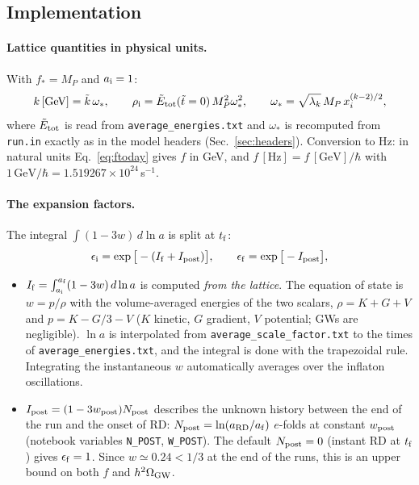 \documentclass[11pt,a4paper]{article}
\newcommand{\MP}{M_P}
\newcommand{\file}[1]{\texttt{#1}}
\begin{document}
\subsection{Implementation}
\label{sec:redshift-impl}
\paragraph{Lattice quantities in physical units.} With $f_*=\MP$ and $a_{\rm i}=1$:
\begin{equation}
k\,[\text{GeV}]=\tilde k\,\omega_*,\qquad
\rho_{\rm i}=\tilde E_{\rm tot}(\tilde t=0)\,\MP^2\omega_*^2,\qquad
\omega_*=\sqrt{\lambda_k}\,\MP\,x_i^{(k-2)/2},
\end{equation}
where $\tilde E_{\rm tot}$ is read from \file{average\_energies.txt} and $\omega_*$ is recomputed from \file{run.in} exactly as in the model headers (Sec.~\ref{sec:headers}). Conversion to Hz: in natural units Eq.~\eqref{eq:ftoday} gives $f$ in GeV, and $f\,[\text{Hz}]=f\,[\text{GeV}]/\hbar$ with $1\,\text{GeV}/\hbar=1.519267\times10^{24}$\,s$^{-1}$.

\paragraph{The expansion factors.} The integral $\int(1-3w)\,d\ln a$ is split at $t_{\rm f}$:
\begin{equation}
\epsilon_{\rm i}=\exp\big[-(I_{\rm f}+I_{\rm post})\big],\qquad \epsilon_{\rm f}=\exp\big[-I_{\rm post}\big],
\end{equation}
\begin{itemize}
\item $I_{\rm f}=\int_{a_{\rm i}}^{a_{\rm f}}(1-3w)\,d\ln a$ is computed \emph{from the lattice}. The equation of state is $w=p/\rho$ with the volume-averaged energies of the two scalars, $\rho=K+G+V$ and $p=K-G/3-V$ ($K$ kinetic, $G$ gradient, $V$ potential; GWs are negligible). $\ln a$ is interpolated from \file{average\_scale\_factor.txt} to the times of \file{average\_energies.txt}, and the integral is done with the trapezoidal rule. Integrating the instantaneous $w$ automatically averages over the inflaton oscillations.
\item $I_{\rm post}=(1-3w_{\rm post})N_{\rm post}$ describes the unknown history between the end of the run and the onset of RD: $N_{\rm post}=\ln(a_{\rm RD}/a_{\rm f})$ $e$-folds at constant $w_{\rm post}$ (notebook variables \texttt{N\_POST}, \texttt{W\_POST}). The default $N_{\rm post}=0$ (instant RD at $t_{\rm f}$) gives $\epsilon_{\rm f}=1$. Since $w\simeq0.24<1/3$ at the end of the runs, this is an upper bound on both $f$ and $h^2\Omega_{\rm GW}$.
\end{itemize}
\end{document}
